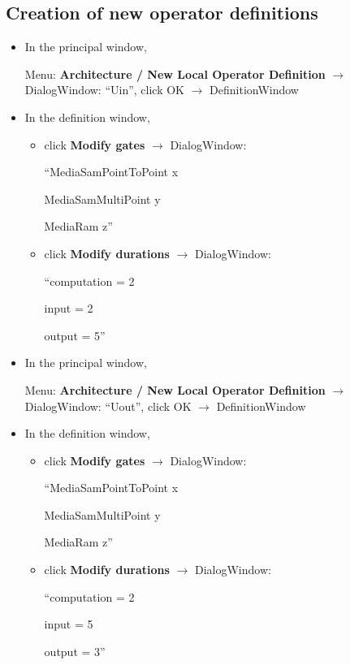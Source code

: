 \documentclass[a4paper,twoside]{report}
\begin{document}
\subsection{Creation of new operator definitions}
\begin{itemize}
\item In the principal window,

Menu: \textbf{Architecture / New Local Operator Definition} $\rightarrow$
DialogWindow: ``Uin'', click OK $\rightarrow$ DefinitionWindow

\item In the definition window,
\begin{itemize}
\item click \textbf{Modify gates} $\rightarrow$ DialogWindow:

``MediaSamPointToPoint x

\hspace{4pt}MediaSamMultiPoint y

\hspace{4pt}MediaRam z''
\item click \textbf{Modify durations} $\rightarrow$ DialogWindow: 

``computation = 2 
 
\hspace{4pt}input = 2

\hspace{4pt}output = 5''
\end{itemize}

\item In the principal window,

Menu: \textbf{Architecture / New Local Operator Definition} $\rightarrow$
DialogWindow: ``Uout'', click OK $\rightarrow$ DefinitionWindow

\item In the definition window,
\begin{itemize}
\item click \textbf{Modify gates} $\rightarrow$ DialogWindow:

``MediaSamPointToPoint x

\hspace{4pt}MediaSamMultiPoint y

\hspace{4pt}MediaRam z''
\item click \textbf{Modify durations} $\rightarrow$ DialogWindow: 

``computation = 2 
 
\hspace{4pt}input = 5

\hspace{4pt}output = 3''

\end{itemize}
\end{itemize}
\end{document}
